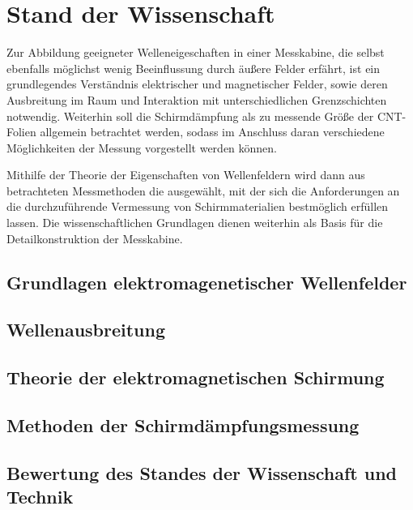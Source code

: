 

\chapter{Stand der Wissenschaft}\label{cha:2}

Zur Abbildung geeigneter Welleneigeschaften in einer Messkabine, die selbst ebenfalls möglichst wenig Beeinflussung durch äußere Felder erfährt, ist ein grundlegendes Verständnis elektrischer und magnetischer Felder, sowie deren Ausbreitung im Raum und Interaktion mit unterschiedlichen Grenzschichten notwendig. Weiterhin soll die Schirmdämpfung als zu messende Größe der CNT-Folien allgemein betrachtet werden, sodass im Anschluss daran verschiedene Möglichkeiten der Messung vorgestellt werden können. \par
\vspace{\linespace}
Mithilfe der Theorie der Eigenschaften von Wellenfeldern wird dann aus betrachteten Messmethoden die ausgewählt, mit der sich die Anforderungen an die durchzuführende Vermessung von Schirmmaterialien bestmöglich erfüllen lassen. Die wissenschaftlichen Grundlagen dienen weiterhin als Basis für die Detailkonstruktion der Messkabine.


\section{Grundlagen elektromagenetischer Wellenfelder}\label{cha:2_Grundlagen}




\section{Wellenausbreitung}\label{cha:2_Wellenausbreitung}




\section{Theorie der elektromagnetischen Schirmung}\label{cha:2_Theorie_der_elektromagnetischen_Schirmung}





\section{Methoden der Schirmdämpfungsmessung}\label{cha:2_Methoden_der_Schirmdaempfungsmessung}




\section{Bewertung des Standes der Wissenschaft und Technik}\label{cha:2_Bewertung_Stand_der_Technik}

